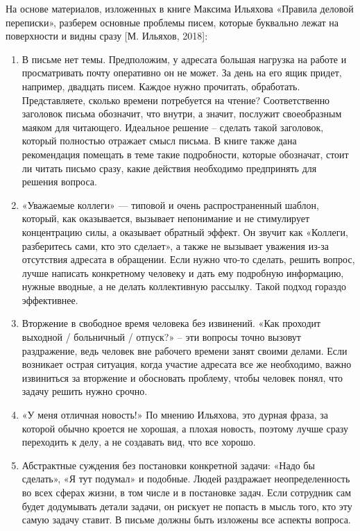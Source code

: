 На основе материалов, изложенных в книге Максима Ильяхова «Правила деловой переписки», разберем основные проблемы писем, которые буквально лежат на поверхности и видны сразу [М. Ильяхов, 2018]:
\begin{enumerate}
    \item В письме нет темы. Предположим, у адресата большая нагрузка на работе и просматривать почту оперативно он не может. За день на его ящик придет, например, двадцать писем. Каждое нужно прочитать, обработать. Представляете, сколько времени потребуется на чтение? Соответственно заголовок письма обозначит, что внутри, а значит, послужит своеобразным маяком для читающего. Идеальное решение – сделать такой заголовок, который полностью отражает смысл письма. В книге также дана рекомендация помещать в теме такие подробности, которые обозначат, стоит ли читать письмо сразу, какие действия необходимо предпринять для решения вопроса.

    \item «Уважаемые коллеги» --- типовой и очень распространенный шаблон, который, как оказывается, вызывает непонимание и не стимулирует концентрацию силы, а оказывает обратный эффект. Он звучит как «Коллеги, разберитесь сами, кто это сделает», а также не вызывает уважения из-за отсутствия адресата в обращении. Если нужно что-то сделать, решить вопрос, лучше написать конкретному человеку и дать ему подробную информацию, нужные вводные, а не делать коллективную рассылку. Такой подход гораздо эффективнее.

    \item Вторжение в свободное время человека без извинений. «Как проходит выходной / больничный / отпуск?» – эти вопросы точно вызовут раздражение, ведь человек вне рабочего времени занят своими делами. Если возникает острая ситуация, когда участие адресата все же необходимо, важно извиниться за вторжение и обосновать проблему, чтобы человек понял, что задачу решить нужно срочно.

    \item «У меня отличная новость!» По мнению Ильяхова, это дурная фраза, за которой обычно кроется не хорошая, а плохая новость, поэтому лучше сразу переходить к делу, а не создавать вид, что все хорошо.

    \item Абстрактные суждения без постановки конкретной задачи: «Надо бы сделать», «Я тут подумал» и подобные. Людей раздражает неопределенность во всех сферах жизни, в том числе и в постановке задач. Если сотрудник сам будет додумывать детали задачи, он рискует не попасть в мысль того, кто эту самую задачу ставит. В письме должны быть изложены все аспекты вопроса.

\end{enumerate}

